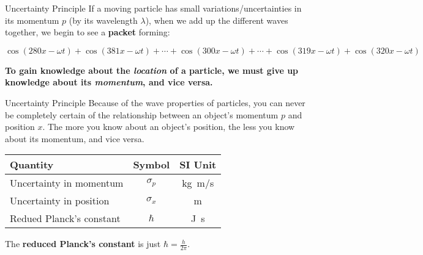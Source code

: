 \documentclass[12pt,compress,aspectratio=169]{beamer}
\newcommand{\eq}[2]{\vspace{#1}{\Large\begin{displaymath}#2\end{displaymath}}}
\begin{document}
\begin{frame}{Uncertainty Principle}
  If a moving particle has small variations/uncertainties in its momentum $p$
  (by its wavelength $\lambda$), when we add up the different waves together, we
  begin to see a \textbf{packet} forming:
  \begin{center}
    {\footnotesize
      $\cos(280x-\omega t)+\cos(381x-\omega t)+\cdots+\cos(300x-\omega t)+
      \cdots+\cos(319x-\omega t)+\cos(320x-\omega t)$}\\
  \end{center}
  \textbf{To gain knowledge about the \emph{location} of a particle, we must
    give up knowledge about its \emph{momentum}, and vice versa.}
\end{frame}



\begin{frame}{Uncertainty Principle}
  Because of the wave properties of particles, you can never be completely
  certain of the relationship between an object's momentum $p$ and position
  $x$. The more you know about an object's position, the less you know about
  its momentum, and vice versa.

  \eq{-.2in}{
    \boxed{\sigma_p\sigma_x\geq \frac{\hbar}2}
  }
  \begin{center}
    \begin{tabular}{l|c|c}
      \rowcolor{pink}
      \textbf{Quantity} & \textbf{Symbol} & \textbf{SI Unit} \\ \hline
      Uncertainty in momentum  & $\sigma_p$ & \si{\kilo\gram.\metre/\second}\\
      Uncertainty in position  & $\sigma_x$ & \si{\metre} \\
      Redued Planck's constant & $\hbar$    & \si{\joule\second}
    \end{tabular}
  \end{center}
  The \textbf{reduced Planck's constant} is just $\hbar=\frac{h}{2\pi}$.
\end{frame}
\end{document}
